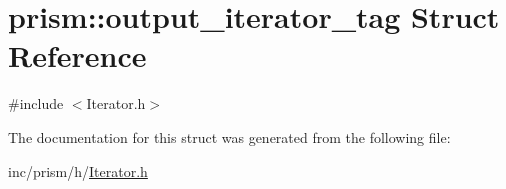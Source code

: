 \hypertarget{structprism_1_1output__iterator__tag}{}\section{prism\+:\+:output\+\_\+iterator\+\_\+tag Struct Reference}
\label{structprism_1_1output__iterator__tag}


{\ttfamily \#include $<$Iterator.\+h$>$}



The documentation for this struct was generated from the following file\+:\begin{DoxyCompactItemize}
\item 
inc/prism/h/\hyperlink{_iterator_8h}{Iterator.\+h}\end{DoxyCompactItemize}
